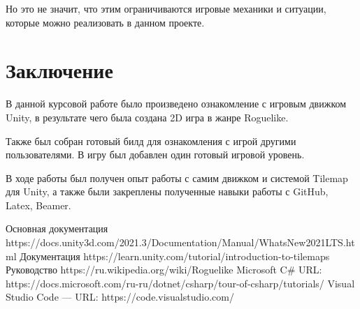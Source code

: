 \documentclass[a4paper,12pt]{article}
\begin{document}
Но это не значит, что этим ограничиваются игровые механики и ситуации, которые можно реализовать в данном проекте.

\newpage
\section{Заключение}
\Large
В данной курсовой работе было произведено ознакомление с игровым движком Unity, в результате чего была создана 2D игра в жанре Roguelike.

Также был собран готовый билд для ознакомления с игрой другими пользователями. В игру был добавлен один готовый игровой уровень. 

В ходе работы был получен опыт работы с самим движком и системой Tilemap для Unity, а также были закреплены полученные навыки работы с GitHub, Latex, Beamer.

\newpage
\large
\begin{thebibliography}{100}

 Основная документация https://docs.unity3d.com/2021.3/Documentation/Manual/WhatsNew2021LTS.html
 Документация https://learn.unity.com/tutorial/introduction-to-tilemaps
 Руководство https://ru.wikipedia.org/wiki/Roguelike
 Microsoft C\# URL: https://docs.microsoft.com/ru-ru/dotnet/csharp/tour-of-csharp/tutorials/
 Visual Studio Code — URL: https://code.visualstudio.com/
\end{thebibliography}

\end{document}
